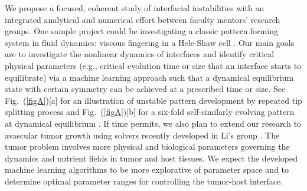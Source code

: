  We propose a focused, coherent study of interfacial instabilities with an integrated analytical and numerical effort between faculty mentors' research groups. One sample project could be investigating a classic pattern forming system in fluid dynamics: viscous fingering in a Hele-Shaw cell \cite{saffman1986}. Our main goals are to investigate the nonlinear dynamics of interfaces and identify critical physical parameters (e.g., critical evolution time or size that an interface starts to equilibrate) via a machine learning approach such that a dynamical equilibrium state with certain symmetry can be achieved at a prescribed time or size. See Fig.~(\ref{figA})[a] for an illustration of unstable pattern development by repeated tip splitting process and Fig.~(\ref{figA})[b] for a six-fold self-similarly evolving pattern at dynamical equilibrium \cite{Li2009}. If time permits, we also plan to extend our research to avascular tumor growth using solvers recently developed in Li's group \cite{MJ2020}. The tumor problem involves more physical and biological parameters governing the dynamics and nutrient fields in tumor and  host tissues. We expect the developed machine learning algorithms to be more explorative of parameter space and to determine optimal parameter ranges for controlling the tumor-host interface.


